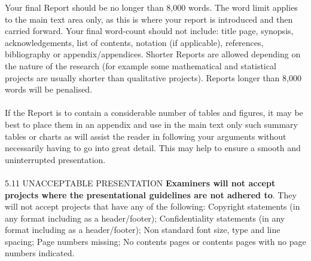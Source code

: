 Your final Report should be no longer than 8,000 words. The word limit applies to the main text area only, as this is where your report is introduced and then carried forward. Your final word-count should not include: title page, synopsis, acknowledgements, list of contents, notation (if applicable), references, bibliography or appendix/appendices. Shorter Reports are allowed depending on the nature of the research (for example some mathematical and statistical projects are usually shorter than qualitative projects). Reports longer than 8,000 words will be penalised.\\
\\
If the Report is to contain a considerable number of tables and figures, it may be best to place them in an appendix and use in the main text only such summary tables or charts as will assist the reader in following your arguments without necessarily having to go into great detail. This may help to ensure a smooth and uninterrupted presentation.\\
\\
5.11 UNACCEPTABLE PRESENTATION
\textbf{Examiners will not accept projects where the presentational guidelines are not adhered to}. They will not accept projects that have any of the following:
Copyright statements (in any format including as a header/footer);
Confidentiality statements (in any format including as a header/footer);
Non standard font size, type and line spacing;
Page numbers missing;
No contents pages or contents pages with no page numbers indicated.



